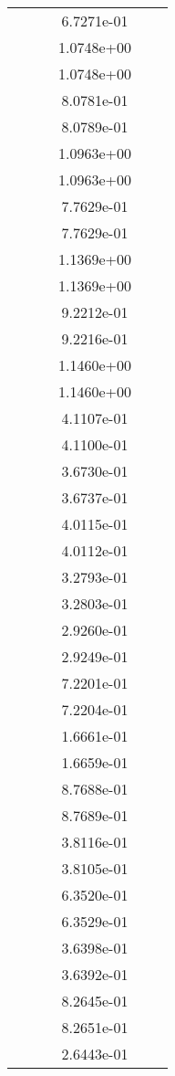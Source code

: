 \begin{xltabular}{\textwidth}{r|rS[table-format=1.3e+2]S[table-format=1.4e+2]S[table-format=1.4e+2]S[table-format=-1.5]}
&  &  & 6.7271e-01 & & \\
&  &  & 1.0748e+00 & & \\
&  &  & 1.0748e+00 & & \\
&  &  & 8.0781e-01 & & \\
&  &  & 8.0789e-01 & & \\
&  &  & 1.0963e+00 & & \\
&  &  & 1.0963e+00 & & \\
&  &  & 7.7629e-01 & & \\
&  &  & 7.7629e-01 & & \\
&  &  & 1.1369e+00 & & \\
&  &  & 1.1369e+00 & & \\
&  &  & 9.2212e-01 & & \\
&  &  & 9.2216e-01 & & \\
&  &  & 1.1460e+00 & & \\
&  &  & 1.1460e+00 & & \\
&  &  & 4.1107e-01 & & \\
&  &  & 4.1100e-01 & & \\
&  &  & 3.6730e-01 & & \\
&  &  & 3.6737e-01 & & \\
&  &  & 4.0115e-01 & & \\
&  &  & 4.0112e-01 & & \\
&  &  & 3.2793e-01 & & \\
&  &  & 3.2803e-01 & & \\
&  &  & 2.9260e-01 & & \\
&  &  & 2.9249e-01 & & \\
&  &  & 7.2201e-01 & & \\
&  &  & 7.2204e-01 & & \\
&  &  & 1.6661e-01 & & \\
&  &  & 1.6659e-01 & & \\
&  &  & 8.7688e-01 & & \\
&  &  & 8.7689e-01 & & \\
&  &  & 3.8116e-01 & & \\
&  &  & 3.8105e-01 & & \\
&  &  & 6.3520e-01 & & \\
&  &  & 6.3529e-01 & & \\
&  &  & 3.6398e-01 & & \\
&  &  & 3.6392e-01 & & \\
&  &  & 8.2645e-01 & & \\
&  &  & 8.2651e-01 & & \\
&  &  & 2.6443e-01 & & \\

\end{xltabular}
